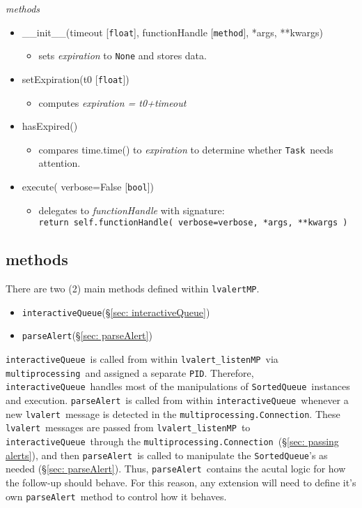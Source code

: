 \documentclass{article}
\newcommand{\PID}{\texttt{PID}}
\newcommand{\multiprocessing}{\texttt{multiprocessing}}
\newcommand{\multiprocessingConnection}{\texttt{multiprocessing.Connection}}
\newcommand{\alert}{\texttt{lvalert}}
\newcommand{\lvalertMP}{\texttt{lvalertMP}}
\newcommand{\lvalertListenMP}{\texttt{lvalert\_listenMP}}
\newcommand{\interactiveQueue}{\texttt{interactiveQueue}}
\newcommand{\parseAlert}{\texttt{parseAlert}}
\newcommand{\SortedQueue}{\texttt{SortedQueue}}
\newcommand{\Task}{\texttt{Task}}
\newcommand{\pythonfloat}{\texttt{float}}
\newcommand{\pythonbool}{\texttt{bool}}
\begin{document}
\noindent
\textit{methods}

\begin{itemize}
    \item{\_\_init\_\_(timeout [\pythonfloat], functionHandle [\texttt{method}], *args, **kwargs)
        \begin{itemize}
            \item{sets \textit{expiration} to \texttt{None} and stores data.}
        \end{itemize}
         }
    \item{setExpiration(t0 [\pythonfloat])
        \begin{itemize}
            \item{computes \textit{expiration = t0+timeout}}
        \end{itemize}
         }
    \item{hasExpired()
        \begin{itemize}
            \item{compares time.time() to \textit{expiration} to determine whether \Task~needs attention.}
        \end{itemize}
         }
    \item{execute( verbose=False [\pythonbool])
        \begin{itemize}
            \item{delegates to \textit{functionHandle} with signature: \\ \texttt{return self.functionHandle( verbose=verbose, *args, **kwargs )}}
        \end{itemize}
         }
\end{itemize}


\subsection{methods}
\label{sec: methods}

There are two (2) main methods defined within \lvalertMP. 
\begin{itemize}
    \item{\interactiveQueue (\S\ref{sec: interactiveQueue})}
    \item{\parseAlert (\S\ref{sec: parseAlert})}
\end{itemize}
\interactiveQueue~is called from within \lvalertListenMP~via \multiprocessing~and assigned a separate \PID.
Therefore, \interactiveQueue~handles most of the manipulations of \SortedQueue~instances and execution.
\parseAlert~is called from within \interactiveQueue~whenever a new \alert~message is detected in the \multiprocessingConnection.
These \alert~messages are passed from \lvalertListenMP~to \interactiveQueue~through the \multiprocessingConnection~(\S\ref{sec: passing alerts}), and then \parseAlert~is called to manipulate the \SortedQueue's as needed (\S\ref{sec: parseAlert}).
Thus, \parseAlert~contains the acutal logic for how the follow-up should behave.
For this reason, any extension will need to define it's own \parseAlert~method to control how it behaves.
\end{document}
